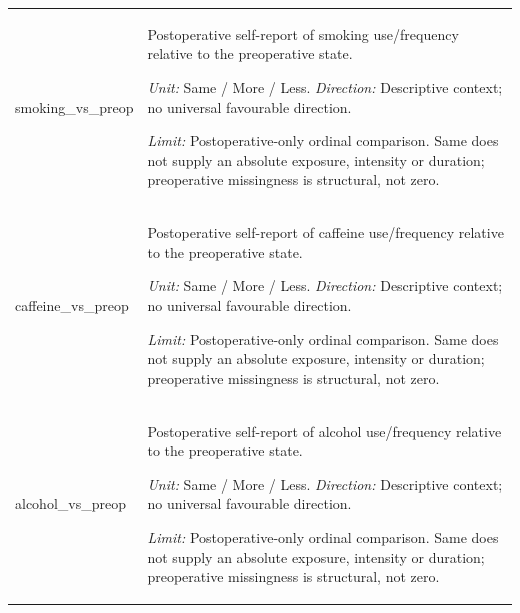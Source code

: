 \begin{longtable}{p{.22\linewidth}p{.70\linewidth}}
{\ttfamily\footnotesize smoking\_\allowbreak{}vs\_\allowbreak{}preop} & Postoperative self-report of smoking use/frequency relative to the preoperative state.\par\textit{Unit:} Same / More / Less. \textit{Direction:} Descriptive context; no universal favourable direction.\par\textit{Limit:} Postoperative-only ordinal comparison. Same does not supply an absolute exposure, intensity or duration; preoperative missingness is structural, not zero. \\[1pt]
{\ttfamily\footnotesize caffeine\_\allowbreak{}vs\_\allowbreak{}preop} & Postoperative self-report of caffeine use/frequency relative to the preoperative state.\par\textit{Unit:} Same / More / Less. \textit{Direction:} Descriptive context; no universal favourable direction.\par\textit{Limit:} Postoperative-only ordinal comparison. Same does not supply an absolute exposure, intensity or duration; preoperative missingness is structural, not zero. \\[1pt]
{\ttfamily\footnotesize alcohol\_\allowbreak{}vs\_\allowbreak{}preop} & Postoperative self-report of alcohol use/frequency relative to the preoperative state.\par\textit{Unit:} Same / More / Less. \textit{Direction:} Descriptive context; no universal favourable direction.\par\textit{Limit:} Postoperative-only ordinal comparison. Same does not supply an absolute exposure, intensity or duration; preoperative missingness is structural, not zero. \\[1pt]
\bottomrule\end{longtable}
